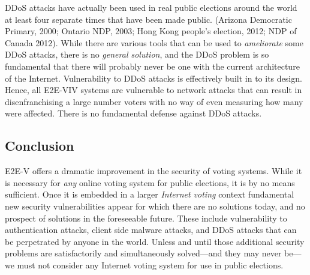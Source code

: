 DDoS attacks have actually been used in real public elections around
the world at least four separate times that have been made
public. (Arizona Democratic Primary, 2000; Ontario NDP, 2003; Hong
Kong people's election, 2012; NDP of Canada 2012). While there are
various tools that can be used to \emph{ameliorate} some DDoS attacks,
there is no \emph{general solution}, and the DDoS problem is so
fundamental that there will probably never be one with the current
architecture of the Internet. Vulnerability to DDoS attacks is
effectively built in to its design. Hence, all E2E-VIV systems are
vulnerable to network attacks that can result in disenfranchising a
large number voters with no way of even measuring how many were
affected. There is no fundamental defense against DDoS attacks.

\subsection{Conclusion}

E2E-V offers a dramatic improvement in the security of voting
systems. While it is necessary for \emph{any} online voting system for
public elections, it is by no means sufficient. Once it is embedded in
a larger \emph{Internet voting} context fundamental new security
vulnerabilities appear for which there are no solutions today, and no
prospect of solutions in the foreseeable future. These include
vulnerability to authentication attacks, client side malware attacks,
and DDoS attacks that can be perpetrated by anyone in the
world. Unless and until those additional security problems are
satisfactorily and simultaneously solved---and they may never be---we
must not consider any Internet voting system for use in public
elections.
